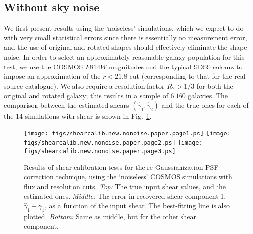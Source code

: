 \documentclass[twocolumn,useAMS,usenatbib]{mn2e}
\begin{document}
\subsection{Without sky noise}\label{SSS:shearcalib-nonoise}

We first present results using the `noiseless' simulations, which we
expect to do with very small statistical errors since there is essentially no
measurement error, and the use of original and rotated shapes should
effectively eliminate the shape noise.  In order to select an
approximately reasonable galaxy population for this test, we use the
COSMOS $F814W$ magnitudes and the typical SDSS colours to impose an
approximation of the $r<21.8$ cut (corresponding to that for the real 
source catalogue).  We also require a resolution factor $R_2>1/3$ for
both the original and rotated galaxy; this results in a sample of
$6~160$ galaxies.  The comparison between the estimated shears
$(\hat{\gamma}_1, \hat{\gamma}_2)$ and the true ones for each of the
14 simulations with shear is shown in
Fig.~\ref{F:basicshearcalib}. 
\begin{figure}
\begin{center}
\texttt{[image: figs/shearcalib.new.nonoise.paper.page1.ps]}
\texttt{[image: figs/shearcalib.new.nonoise.paper.page2.ps]}
\texttt{[image: figs/shearcalib.new.nonoise.paper.page3.ps]}
\caption{\label{F:basicshearcalib}
Results of shear calibration tests for the re-Gaussianization
PSF-correction technique, using the `noiseless' COSMOS simulations
with flux and resolution cuts. 
{\em
  Top:} The true input shear values, and the estimated ones.  {\em
  Middle:} The error in recovered shear component 1,
$\hat{\gamma}_1-\gamma_1$, as a function of the input shear.  The
best-fitting line is also plotted.
{\em Bottom:} Same as middle, but for the other shear component.}
\end{center}
\end{figure}
\end{document}
